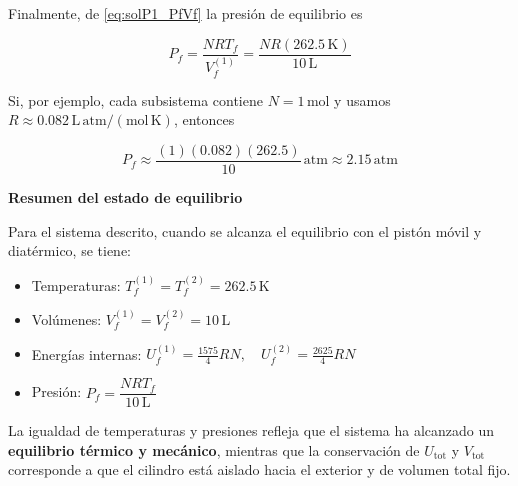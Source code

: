 \documentclass{article}
\begin{document}
Finalmente, de \eqref{eq:solP1_PfVf} la presión de equilibrio es

\begin{equation}
P_{f}
= \frac{N R T_{f}}{V^{(1)}_{f}}
= \frac{N R (262.5\,\mathrm{K})}{10\,\mathrm{L}}
\label{eq:solP1_Pf_general}
\end{equation}

Si, por ejemplo, cada subsistema contiene \(N = 1\,\text{mol}\) y usamos
\(R \approx 0.082\,\mathrm{L\,atm/(mol\,K)}\), entonces

\[
P_{f} \approx \frac{(1)(0.082)(262.5)}{10}\,\mathrm{atm}
\approx 2.15\,\mathrm{atm}
\]

\vspace{0.4cm}
\noindent
\textcolor{Tarawera}{\textbf{Resumen del estado de equilibrio}}

Para el sistema descrito, cuando se alcanza el equilibrio con el pistón móvil y
diatérmico, se tiene:

\begin{itemize}
  \item[$\bullet$]
  Temperaturas:
  \(\displaystyle T^{(1)}_{f} = T^{(2)}_{f} = 262.5\,\mathrm{K}\)
  \item[$\bullet$]
  Volúmenes:
  \(\displaystyle V^{(1)}_{f} = V^{(2)}_{f} = 10\,\mathrm{L}\)
  \item[$\bullet$]
  Energías internas:
  \(\displaystyle
    U^{(1)}_{f} = \frac{1575}{4} R N,
    \quad
    U^{(2)}_{f} = \frac{2625}{4} R N
  \)
  \item[$\bullet$]
  Presión:
  \(\displaystyle
    P_{f} = \dfrac{N R T_{f}}{10\,\mathrm{L}}
  \)
\end{itemize}

La igualdad de temperaturas y presiones refleja que el sistema ha alcanzado un
\textcolor{trueblue}{\textbf{equilibrio térmico y mecánico}}, mientras que la
conservación de \(U_{\text{tot}}\) y \(V_{\text{tot}}\) corresponde a que el cilindro
está aislado hacia el exterior y de volumen total fijo.


\end{document}
